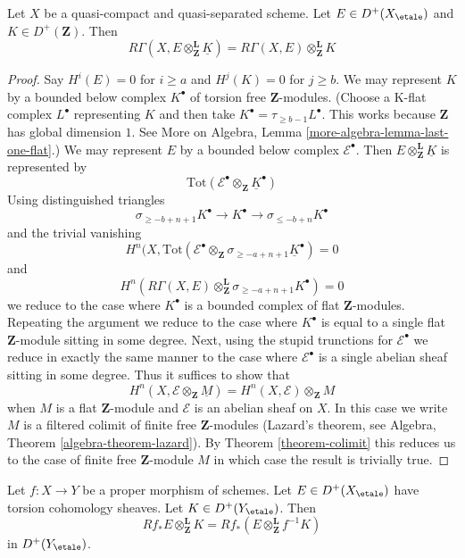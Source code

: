 \begin{lemma}
\label{lemma-pull-out-constant}
Let $X$ be a quasi-compact and quasi-separated scheme.
Let $E \in D^+(X_\etale)$ and $K \in D^+(\mathbf{Z})$.
Then
$$
R\Gamma(X, E \otimes_\mathbf{Z}^\mathbf{L} \underline{K}) =
R\Gamma(X, E) \otimes_\mathbf{Z}^\mathbf{L} K
$$
\end{lemma}

\begin{proof}
Say $H^i(E) = 0$ for $i \geq a$ and $H^j(K) = 0$ for $j \geq b$.
We may represent $K$ by a bounded below complex
$K^\bullet$ of torsion free $\mathbf{Z}$-modules.
(Choose a K-flat complex $L^\bullet$ representing $K$ and then
take $K^\bullet = \tau_{\geq b - 1}L^\bullet$. This works because
$\mathbf{Z}$ has global dimension $1$. See
More on Algebra, Lemma \ref{more-algebra-lemma-last-one-flat}.)
We may represent $E$ by a bounded below complex
$\mathcal{E}^\bullet$.
Then $E \otimes_\mathbf{Z}^\mathbf{L} \underline{K}$ is
represented by
$$
\text{Tot}(\mathcal{E}^\bullet \otimes_\mathbf{Z} \underline{K}^\bullet)
$$
Using distinguished triangles
$$
\sigma_{\geq -b + n + 1}K^\bullet
\to K^\bullet \to
\sigma_{\leq -b + n}K^\bullet
$$
and the trivial vanishing
$$
H^n(X,
\text{Tot}(\mathcal{E}^\bullet \otimes_\mathbf{Z}
\sigma_{\geq -a + n + 1}\underline{K}^\bullet) = 0
$$
and
$$
H^n(R\Gamma(X, E)
\otimes_\mathbf{Z}^\mathbf{L} \sigma_{\geq -a + n + 1}K^\bullet) = 0
$$
we reduce to the case where $K^\bullet$ is a bounded complex of
flat $\mathbf{Z}$-modules. Repeating the argument we reduce to the
case where $K^\bullet$ is equal to a single flat $\mathbf{Z}$-module
sitting in some degree. Next, using the stupid
trunctions for $\mathcal{E}^\bullet$
we reduce in exactly the same manner to the case where
$\mathcal{E}^\bullet$ is a single abelian sheaf sitting
in some degree. Thus it suffices to show that
$$
H^n(X, \mathcal{E} \otimes_\mathbf{Z} \underline{M}) =
H^n(X, \mathcal{E}) \otimes_\mathbf{Z} M
$$
when $M$ is a flat $\mathbf{Z}$-module and $\mathcal{E}$
is an abelian sheaf on $X$. In this case we
write $M$ is a filtered colimit of finite free $\mathbf{Z}$-modules
(Lazard's theorem, see Algebra, Theorem \ref{algebra-theorem-lazard}).
By Theorem \ref{theorem-colimit} this reduces us to the case of finite free
$\mathbf{Z}$-module $M$ in which case the result is trivially true.
\end{proof}

\begin{lemma}
\label{lemma-projection-formula-proper}
Let $f : X \to Y$ be a proper morphism of schemes.
Let $E \in D^+(X_\etale)$ have torsion cohomology sheaves.
Let $K \in D^+(Y_\etale)$. Then
$$
Rf_*E \otimes_\mathbf{Z}^\mathbf{L} K =
Rf_*(E \otimes_\mathbf{Z}^\mathbf{L} f^{-1}K)
$$
in $D^+(Y_\etale)$.
\end{lemma}

